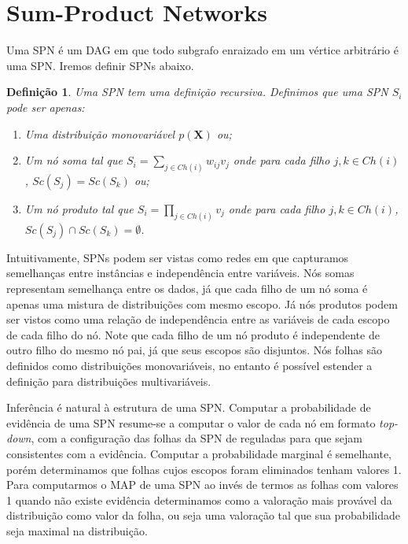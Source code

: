 \documentclass{amsart}
\theoremstyle{plain}
\newcounter{dummy-def}\numberwithin{dummy-def}{section}
\newtheorem{definition}[dummy-def]{Definição}
\newcounter{dummy-thm}\numberwithin{dummy-thm}{section}
\newcounter{dummy-prop}\numberwithin{dummy-prop}{section}
\newcounter{dummy-ex}\numberwithin{dummy-ex}{section}
\newcounter{dummy-eg}\numberwithin{dummy-eg}{section}
\numberwithin{equation}{section}
\newcommand{\set}[1]{\mathbf{#1}}
\begin{document}
\section{Sum-Product Networks}

Uma SPN é um DAG em que todo subgrafo enraizado em um vértice arbitrário é uma SPN. Iremos definir
SPNs abaixo.

\begin{definition}\label{gd-def}
  Uma SPN tem uma definição recursiva. Definimos que uma SPN $S_i$ pode ser apenas:
  \begin{enumerate}[label=(\roman*)]
    \item\label{gd-ref-1} Uma distribuição monovariável $p(\set{X})$ ou;
    \item\label{gd-ref-2} Um nó soma tal que $S_i=\sum_{j\in Ch(i)} w_{ij}v_j$ onde para cada filho
      $j,k\in Ch(i)$, $Sc(S_j)=Sc(S_k)$ ou;
    \item\label{gd-ref-3} Um nó produto tal que $S_i=\prod_{j\in Ch(i)} v_j$ onde para cada filho
      $j,k\in Ch(i)$, $Sc(S_j)\cap Sc(S_k)=\emptyset$.
  \end{enumerate}
\end{definition}

Intuitivamente, SPNs podem ser vistas como redes em que capturamos semelhanças entre instâncias e
independência entre variáveis. Nós somas representam semelhança entre os dados, já que cada filho
de um nó soma é apenas uma mistura de distribuições com mesmo escopo. Já nós produtos podem ser
vistos como uma relação de independência entre as variáveis de cada escopo de cada filho do nó.
Note que cada filho de um nó produto é independente de outro filho do mesmo nó pai, já que seus
escopos são disjuntos. Nós folhas são definidos como distribuições monovariáveis, no entanto é
possível estender a definição para distribuições multivariáveis.

Inferência é natural à estrutura de uma SPN. Computar a probabilidade de evidência de uma SPN
resume-se a computar o valor de cada nó em formato \textit{top-down}, com a configuração das folhas
da SPN de reguladas para que sejam consistentes com a evidência. Computar a probabilidade marginal
é semelhante, porém determinamos que folhas cujos escopos foram eliminados tenham valores 1. Para
computarmos o MAP de uma SPN ao invés de termos as folhas com valores 1 quando não existe
evidência determinamos como a valoração mais provável da distribuição como valor da folha, ou seja
uma valoração tal que sua probabilidade seja maximal na distribuição.
\end{document}
